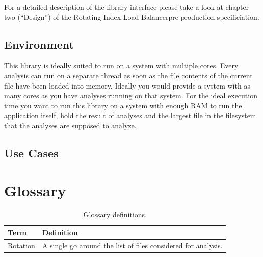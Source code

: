 \documentclass[11pt]{article} %
\newcommand{\rilb}{Rotating Index Load Balancer}
\begin{document}
  For a detailed description of the library interface please take a look at chapter two (``Design'') of the \rilb pre-production specificiation\hyperref[fn:pp-spec]{\footnotemark[1]}.


  \subsection{Environment}\label{sec:3.1}

  This library is ideally suited to run on a system with multiple cores. Every analysis can run on a separate thread as soon as the file contents of the current file have been loaded into memory. Ideally you would provide a system with as many cores as you have analyses running on that system. For the ideal execution time you want to run this library on a system with enough RAM to run the application itself, hold the result of analyses and the largest file in the filesystem that the analyses are supposed to analyze.


  \subsection{Use Cases}\label{sec:3.2}




  \newpage



  \section{Glossary}

  \begin{table}[H]
    \centering
    \begin{tabular}{p{.3\linewidth} | p{.6\linewidth}}
      \textbf{Term} & \textbf{Definition}
      \\\hline
      Rotation      & A single go around the list of files considered for analysis.
    \end{tabular}
    \caption{Glossary definitions.}
    \label{tab:glossary}
  \end{table}

  \printbibliography[heading=bibintoc]
  \listoffigures
  \listoftables
\end{document}
